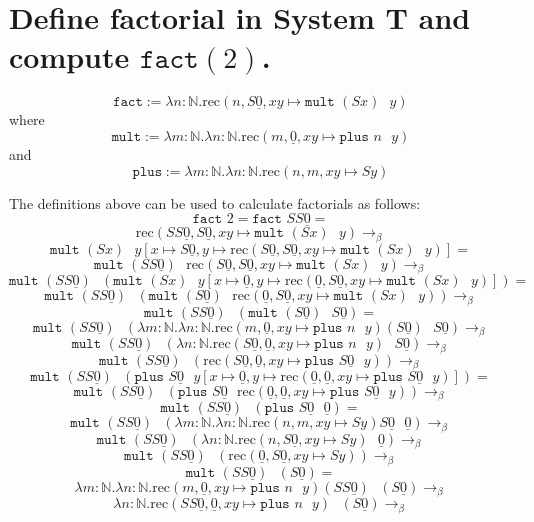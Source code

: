 \documentclass{article}
\newcommand{\nat}{\mathbb{N}}
\newcommand{\z}{\underline{0}}
\begin{document}
\section{Define factorial in System T and compute $\texttt{fact}(2)$.}
$$\texttt{fact} := \lambda n :\nat.\text{rec}(n,S\z,xy\mapsto \texttt{mult }(Sx)\text{ }y)$$
where
$$\texttt{mult} := \lambda m : \nat.\lambda n:\nat.\text{rec}(m,\z,xy\mapsto
\texttt{plus }n\text{ }y)$$
and
$$\texttt{plus} := \lambda m : \nat.\lambda n:\nat.\text{rec}(n,m,xy\mapsto Sy)$$

The definitions above can be used to calculate factorials as follows:
$$\texttt{fact }2 = \texttt{fact } SS\z = $$
$$\text{rec}(SS\z,S\z,xy\mapsto \texttt{mult }(Sx)\text{ }y)
\to_{\beta}$$
$$\texttt{mult }(Sx)\text{ }y[x \mapsto S\z, y\mapsto \text{rec}(S\z,S\z,xy\mapsto \texttt{mult }(Sx)\text{ }y)] = $$
$$\texttt{mult }(SS\z)\text{ }\text{rec}(S\z,S\z,xy\mapsto \texttt{mult }(Sx)\text{ }y)
\to_{\beta}$$
$$\texttt{mult }(SS\z)\text{ }(\texttt{mult }(Sx)\text{ }y[x \mapsto \z, y\mapsto \text{rec}(\z,S\z,xy\mapsto \texttt{mult }(Sx)\text{ }y)]) = $$
$$\texttt{mult }(SS\z)\text{ }(\texttt{mult }(S\z)\text{ }\text{rec}(\z,S\z,xy\mapsto \texttt{mult }(Sx)\text{ }y)) 
\to_{\beta}$$
$$\texttt{mult }(SS\z)\text{ }(\texttt{mult }(S\z)\text{ }S\z) = $$
$$\texttt{mult }(SS\z)\text{ }(\lambda m : \nat.\lambda n:\nat.\text{rec}(m,\z,xy\mapsto
\texttt{plus }n\text{ }y)(S\z)\text{ }S\z) \to_{\beta} $$
$$\texttt{mult }(SS\z)\text{ }(\lambda n:\nat.\text{rec}(S\z,\z,xy\mapsto
\texttt{plus }n\text{ }y)\text{ }S\z) \to_{\beta} $$
$$\texttt{mult }(SS\z)\text{ }
(\text{rec}(S\z,\z,xy\mapsto \texttt{plus }S\z\text{ }y))
\to_{\beta} $$
$$\texttt{mult }(SS\z)\text{ }
(\texttt{plus } S\z\text{ }y[x\mapsto \z, y\mapsto \text{rec}(\z,\z,xy\mapsto \texttt{plus }S\z\text{ }y)])
=$$
$$\texttt{mult }(SS\z)\text{ }
(\texttt{plus } S\z\text{ }\text{rec}(\z,\z,xy\mapsto \texttt{plus }S\z\text{ }y))
\to_{\beta} $$
$$\texttt{mult }(SS\z)\text{ }
(\texttt{plus } S\z\text{ }\z)
=$$
$$\texttt{mult }(SS\z)\text{ }
(\lambda m : \nat.\lambda n:\nat.\text{rec}(n,m,xy\mapsto Sy) S\z\text{ }\z)
\to_{\beta} $$
$$\texttt{mult }(SS\z)\text{ }
(\lambda n:\nat.\text{rec}(n,S\z,xy\mapsto Sy) \text{ }\z)
\to_{\beta} $$
$$\texttt{mult }(SS\z)\text{ }
(\text{rec}(\z,S\z,xy\mapsto Sy))
\to_{\beta} $$
$$\texttt{mult }(SS\z)\text{ } (S\z)
= $$
$$ \lambda m : \nat.\lambda n:\nat.\text{rec}(m,\z,xy\mapsto \texttt{plus }n\text{ }y)
(SS\z)\text{ } (S\z)
\to_{\beta} $$
$$ \lambda n:\nat.\text{rec}(SS\z,\z,xy\mapsto \texttt{plus }n\text{ }y)
\text{ } (S\z)
\to_{\beta} $$
\end{document}
